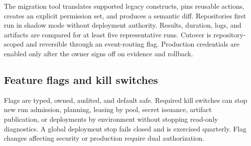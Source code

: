 The migration tool translates supported legacy constructs, pins reusable actions,
creates an explicit permission set, and produces a semantic diff. Repositories first
run in shadow mode without deployment authority. Results, duration, logs, and artifacts
are compared for at least five representative runs. Cutover is repository-scoped and
reversible through an event-routing flag. Production credentials are enabled only after
the owner signs off on evidence and rollback.

\subsection{Feature flags and kill switches}

Flags are typed, owned, audited, and default safe. Required kill switches can stop new
run admission, planning, leasing by pool, secret issuance, artifact publication, or
deployments by environment without stopping read-only diagnostics. A global deployment
stop fails closed and is exercised quarterly. Flag changes affecting security or
production require dual authorization.

